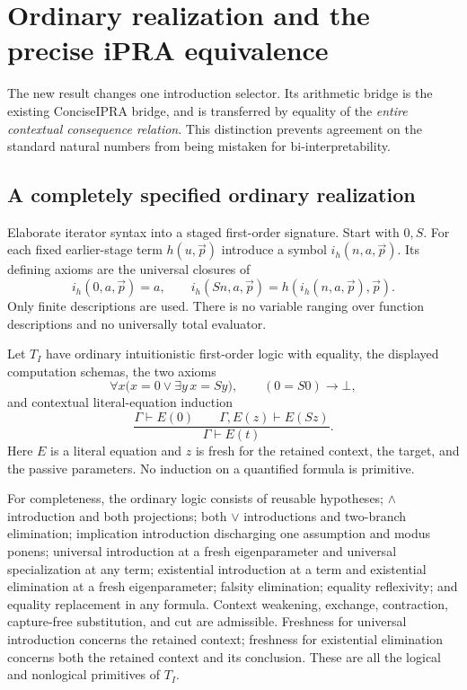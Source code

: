 \section{Ordinary realization and the precise iPRA equivalence}

The new result changes one introduction selector.  Its arithmetic bridge is
the existing ConciseIPRA bridge, and is transferred by equality of the
\emph{entire contextual consequence relation}.  This distinction prevents
agreement on the standard natural numbers from being mistaken for
bi-interpretability.

\subsection{A completely specified ordinary realization}
Elaborate iterator syntax into a staged first-order signature.  Start with
$0,S$.  For each fixed earlier-stage term $h(u,\vec p)$ introduce a symbol
$i_h(n,a,\vec p)$.  Its defining axioms are the universal closures of
\[
 i_h(0,a,\vec p)=a,\qquad
 i_h(Sn,a,\vec p)=h(i_h(n,a,\vec p),\vec p).
\]
Only finite descriptions are used.  There is no variable ranging over
function descriptions and no universally total evaluator.

Let $T_I$ have ordinary intuitionistic first-order logic with equality,
the displayed computation schemas, the two axioms
\[
 \forall x\bigl(x=0\lor\exists y\,x=Sy\bigr),\qquad
 (0=S0)\to\bot,
\]
and contextual literal-equation induction
\[
 \frac{\Gamma\vdash E(0)\qquad\Gamma,E(z)\vdash E(Sz)}
      {\Gamma\vdash E(t)}.
\]
Here $E$ is a literal equation and $z$ is fresh for the retained context,
the target, and the passive parameters.  No induction on a quantified
formula is primitive.

For completeness, the ordinary logic consists of reusable hypotheses;
$\land$ introduction and both projections; both $\lor$ introductions and
two-branch elimination; implication introduction discharging one
assumption and modus ponens; universal introduction at a fresh
eigenparameter and universal specialization at any term; existential
introduction at a term and existential elimination at a fresh
eigenparameter; falsity elimination; equality reflexivity; and equality
replacement in any formula.  Context weakening, exchange, contraction,
capture-free substitution, and cut are admissible.  Freshness for
universal introduction concerns the retained context; freshness for
existential elimination concerns both the retained context and its
conclusion.  These are all the logical and nonlogical primitives of
$T_I$.

